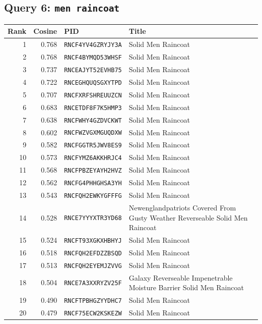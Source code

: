 \subsection*{Query 6: \texttt{men raincoat}}
\begin{longtable}{r r l p{}}
\toprule
Rank & Cosine & PID & Title \\
\midrule
\endhead
1 & 0.768 & \texttt{RNCF4YV4GZRYJY3A} & Solid Men Raincoat \\
2 & 0.768 & \texttt{RNCF4BYMQD53WHSF} & Solid Men Raincoat \\
3 & 0.737 & \texttt{RNCEAJYT52EVHB75} & Solid Men Raincoat \\
4 & 0.722 & \texttt{RNCEGHQUQSGXYTPD} & Solid Men Raincoat \\
5 & 0.707 & \texttt{RNCFXRFSHREUUZCN} & Solid Men Raincoat \\
6 & 0.683 & \texttt{RNCETDF8F7K5HMP3} & Solid Men Raincoat \\
7 & 0.638 & \texttt{RNCFWHY4GZDVCKWT} & Solid Men Raincoat \\
8 & 0.602 & \texttt{RNCFWZVGXMGUQDXW} & Solid Men Raincoat \\
9 & 0.582 & \texttt{RNCFGGTR5JWV8ES9} & Solid Men Raincoat \\
10 & 0.573 & \texttt{RNCFYMZ6AKKHRJC4} & Solid Men Raincoat \\
11 & 0.568 & \texttt{RNCFPBZEYAYH2HVZ} & Solid Men Raincoat \\
12 & 0.562 & \texttt{RNCFG4PHHGHSA3YH} & Solid Men Raincoat \\
13 & 0.543 & \texttt{RNCFQH2EWKYGFFFG} & Solid Men Raincoat \\
14 & 0.528 & \texttt{RNCE7YYYXTR3YD68} & Newenglandpatriots Covered From Gusty Weather Reverseable Solid Men Raincoat \\
15 & 0.524 & \texttt{RNCFT93XGKXHBHYJ} & Solid Men Raincoat \\
16 & 0.518 & \texttt{RNCFQH2EFDZZBSQD} & Solid Men Raincoat \\
17 & 0.513 & \texttt{RNCFQH2EYEMJZVVG} & Solid Men Raincoat \\
18 & 0.504 & \texttt{RNCE7A3XXRYZV25F} & Galaxy Reverseable Impenetrable Moisture Barrier Solid Men Raincoat \\
19 & 0.490 & \texttt{RNCFTPBHGZYYDHC7} & Solid Men Raincoat \\
20 & 0.479 & \texttt{RNCF75ECW2KSKEZW} & Solid Men Raincoat \\
\end{longtable}
